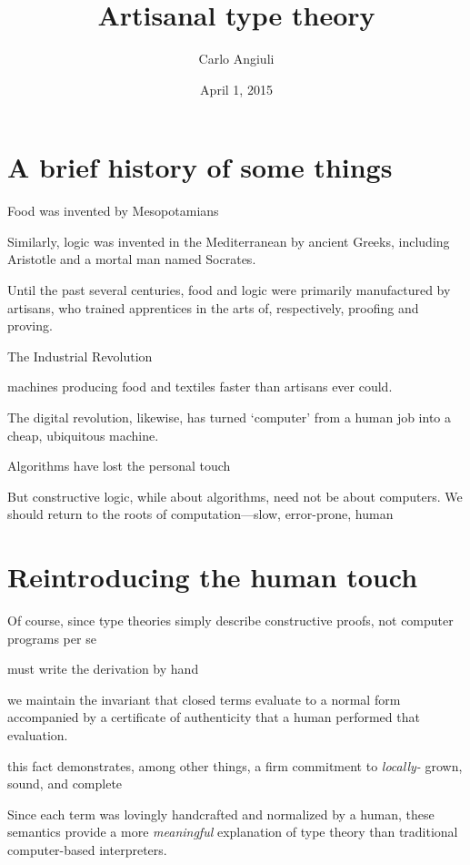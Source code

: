 \documentclass[10pt]{article}
\title{Artisanal type theory}
\author{Carlo Angiuli}
\date{April 1, 2015}
\begin{document}
\maketitle

\section{A brief history of some things}

Food was invented by Mesopotamians

Similarly, logic was invented in the Mediterranean by ancient Greeks, including
Aristotle and a mortal man \cite{Aristotle40} named Socrates.

Until the past several centuries, food and logic were primarily manufactured by
artisans, who trained apprentices in the arts of, respectively, proofing and
proving.

The Industrial Revolution 

machines producing food and textiles faster than artisans ever could.

The digital revolution, likewise, has turned `computer' from a human job into a
cheap, ubiquitous machine.

Algorithms have lost the personal touch



But constructive logic, while about algorithms, need not be about computers. We
should return to the roots of computation---slow, error-prone, human 


\section{Reintroducing the human touch}

Of course, since type theories simply describe constructive proofs, not computer
programs per se \cite{MartinLof85}

must write the derivation by hand

we maintain the invariant that closed terms evaluate to a normal form
accompanied by a certificate of authenticity that a human performed that
evaluation.

this fact demonstrates, among other things, a firm commitment to \emph{locally-}
grown, sound, and complete 

Since each term was lovingly handcrafted and normalized by a human, these
semantics provide a more \emph{meaningful} explanation of type theory than
traditional computer-based interpreters.
\end{document}
